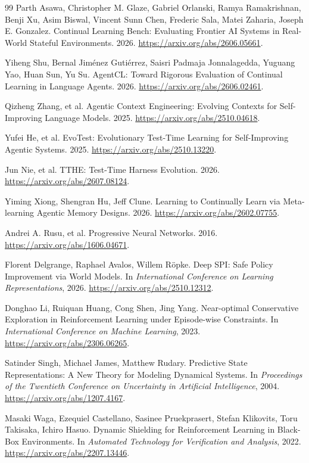 \begin{thebibliography}{99}
Parth Asawa, Christopher M. Glaze, Gabriel Orlanski, Ramya Ramakrishnan, Benji Xu, Asim Biswal, Vincent Sunn Chen, Frederic Sala, Matei Zaharia, Joseph E. Gonzalez.
Continual Learning Bench: Evaluating Frontier AI Systems in Real-World Stateful Environments.
2026.
\url{https://arxiv.org/abs/2606.05661}.

Yiheng Shu, Bernal Jim{\'e}nez Guti{\'e}rrez, Saisri Padmaja Jonnalagedda, Yuguang Yao, Huan Sun, Yu Su.
{AgentCL}: Toward Rigorous Evaluation of Continual Learning in Language Agents.
2026.
\url{https://arxiv.org/abs/2606.02461}.

Qizheng Zhang, et al.
Agentic Context Engineering: Evolving Contexts for Self-Improving Language Models.
2025.
\url{https://arxiv.org/abs/2510.04618}.

Yufei He, et al.
{EvoTest}: Evolutionary Test-Time Learning for Self-Improving Agentic Systems.
2025.
\url{https://arxiv.org/abs/2510.13220}.

Jun Nie, et al.
{TTHE}: Test-Time Harness Evolution.
2026.
\url{https://arxiv.org/abs/2607.08124}.

Yiming Xiong, Shengran Hu, Jeff Clune.
Learning to Continually Learn via Meta-learning Agentic Memory Designs.
2026.
\url{https://arxiv.org/abs/2602.07755}.

Andrei A. Rusu, et al.
Progressive Neural Networks.
2016.
\url{https://arxiv.org/abs/1606.04671}.

Florent Delgrange, Raphael Avalos, Willem R{\"o}pke.
Deep SPI: Safe Policy Improvement via World Models.
In \emph{International Conference on Learning Representations}, 2026.
\url{https://arxiv.org/abs/2510.12312}.

Donghao Li, Ruiquan Huang, Cong Shen, Jing Yang.
Near-optimal Conservative Exploration in Reinforcement Learning under Episode-wise Constraints.
In \emph{International Conference on Machine Learning}, 2023.
\url{https://arxiv.org/abs/2306.06265}.

Satinder Singh, Michael James, Matthew Rudary.
Predictive State Representations: A New Theory for Modeling Dynamical Systems.
In \emph{Proceedings of the Twentieth Conference on Uncertainty in Artificial Intelligence}, 2004.
\url{https://arxiv.org/abs/1207.4167}.

Masaki Waga, Ezequiel Castellano, Sasinee Pruekprasert, Stefan Klikovits, Toru Takisaka, Ichiro Hasuo.
Dynamic Shielding for Reinforcement Learning in Black-Box Environments.
In \emph{Automated Technology for Verification and Analysis}, 2022.
\url{https://arxiv.org/abs/2207.13446}.


\end{thebibliography}
